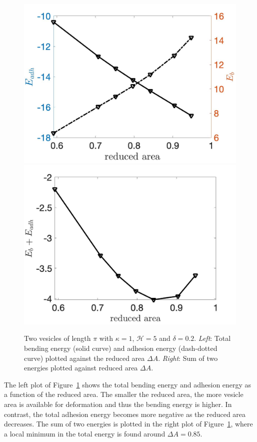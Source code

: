 \documentclass[prf,superscriptaddress,showpacs]{revtex4-1}
\begin{document}
\begin{figure}
\includegraphics[keepaspectratio=true,scale=0.175]{figs/Dec18_Ebleft_Eadhright_vs_rA_adR0p2_adS502.jpeg}
\includegraphics[keepaspectratio=true,scale=0.175]{figs/Dec18_EbEadh_vs_rA_adR0p2_adS502.jpeg}
  \caption{\label{fig:Dec18_vesicle_equilibrium1} Two vesicles of length
  $\pi$ with $\kappa=1$, $\mathcal{H}=5$ and $\delta=0.2$.  {\em Left}:
  Total bending energy (solid curve) and adhesion energy (dash-dotted
  curve) plotted against the reduced area $\Delta A$. {\em Right}: Sum
  of two energies plotted against reduced area $\Delta A$.}
\end{figure}

The left plot of Figure~\ref{fig:Dec18_vesicle_equilibrium1} shows the
total bending energy and adhesion energy as a function of the reduced
area. The smaller the reduced area, the more vesicle area is available
for deformation and thus the bending energy is higher.  In contrast, the
total adhesion energy becomes more negative as the reduced area
decreases.  The sum of two energies is plotted in the right plot of
Figure~\ref{fig:Dec18_vesicle_equilibrium1}, where a local minimum in
the total energy is found around $\Delta A = 0.85$.
\end{document}
